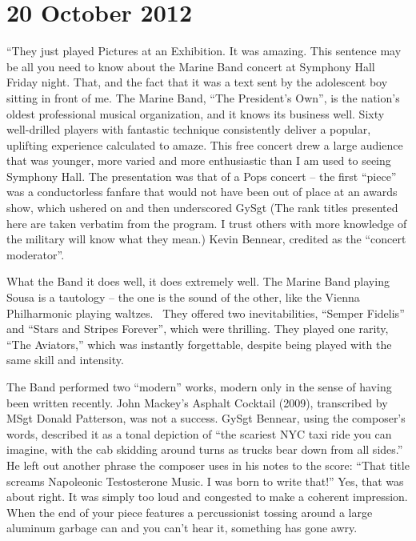 \chapter{20 October 2012}

``They just played Pictures at an Exhibition. It was amazing. This sentence may be all you need to know about the Marine Band concert at Symphony Hall Friday night. That, and the fact that it was a text sent by the adolescent boy sitting in front of me. The Marine Band, “The President’s Own”, is the nation’s oldest professional musical organization, and it knows its business well. Sixty well-drilled players with fantastic technique consistently deliver a popular, uplifting experience calculated to amaze. This free concert drew a large audience that was younger, more varied and more enthusiastic than I am used to seeing Symphony Hall. The presentation was that of a Pops concert – the first “piece” was a conductorless fanfare that would not have been out of place at an awards show, which ushered on and then underscored GySgt (The rank titles presented here are taken verbatim from the program. I trust others with more knowledge of the military will know what they mean.) Kevin Bennear, credited as the “concert moderator”.

What the Band it does well, it does extremely well. The Marine Band playing Sousa is a tautology – the one is the sound of the other, like the Vienna Philharmonic playing waltzes.  They offered two inevitabilities, “Semper Fidelis” and “Stars and Stripes Forever”, which were thrilling. They played one rarity, “The Aviators,” which was instantly forgettable, despite being played with the same skill and intensity.

The Band performed two “modern” works, modern only in the sense of having been written recently. John Mackey’s Asphalt Cocktail (2009), transcribed by MSgt Donald Patterson, was not a success. GySgt Bennear, using the composer’s words, described it as a tonal depiction of “the scariest NYC taxi ride you can imagine, with the cab skidding around turns as trucks bear down from all sides.” He left out another phrase the composer uses in his notes to the score: “That title screams Napoleonic Testosterone Music. I was born to write that!” Yes, that was about right. It was simply too loud and congested to make a coherent impression. When the end of your piece features a percussionist tossing around a large aluminum garbage can and you can’t hear it, something has gone awry.

